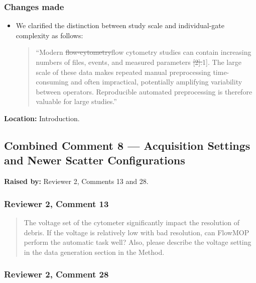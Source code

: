 \documentclass[
  11pt,
  a4paper,
]{article}
\begin{document}
\subsubsection{Changes made}\label{changes-made-6}

\begin{itemize}
\item
  We clarified the distinction between study scale and individual-gate
  complexity as follows:

  \begin{quote}
  ``Modern
  {\color{revisionred}\sout{flow-cytometry}}{\color{revisionblue}flow
  cytometry} studies can contain increasing numbers of files, events,
  and measured parameters
  {\color{revisionred}\sout{{[}2{]}.}}{\color{revisionblue}{[}1{]}.} The
  large scale of these data makes repeated manual preprocessing
  time-consuming and often impractical, potentially amplifying
  variability between operators. Reproducible automated preprocessing is
  therefore valuable for large studies.''
  \end{quote}
\end{itemize}

\textbf{Location:} Introduction.

\subsection{Combined Comment 8 --- Acquisition Settings and Newer
Scatter
Configurations}\label{combined-comment-8--acquisition-settings-and-newer-scatter-configurations}

\textbf{Raised by:} Reviewer 2, Comments 13 and 28.

\subsubsection{Reviewer 2, Comment 13}\label{reviewer-2-comment-13}

\begin{quote}
The voltage set of the cytometer significantly impact the resolution of
debris. If the voltage is relatively low with bad resolution, can
FlowMOP perform the automatic task well? Also, please describe the
voltage setting in the data generation section in the Method.
\end{quote}

\subsubsection{Reviewer 2, Comment 28}\label{reviewer-2-comment-28}
\end{document}
